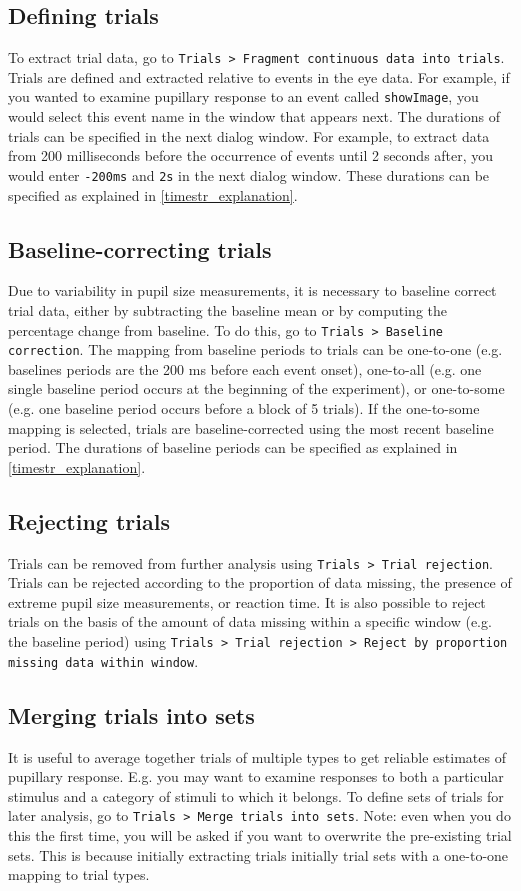 \documentclass{article}
\newcommand{\erp}{Trials }
\begin{document}
\subsection{Defining trials}
To extract trial data, go to \texttt{\erp > Fragment continuous data into trials}. Trials are defined and extracted relative to events in the eye data. For example, if you wanted to examine pupillary response to an event called \texttt{showImage}, you would select this event name in the window that appears next. The durations of trials can be specified in the next dialog window. For example, to extract data from 200 milliseconds before the occurrence of events until 2 seconds after, you would enter \texttt{-200ms} and \texttt{2s} in the next dialog window. These durations can be specified as explained in \ref{timestr_explanation}.
\subsection{Baseline-correcting trials}
Due to variability in pupil size measurements, it is necessary to baseline correct trial data, either by subtracting the baseline mean or by computing the percentage change from baseline. To do this, go to \texttt{\erp > Baseline correction}. The mapping from baseline periods to trials can be one-to-one (e.g. baselines periods are the 200 ms before each event onset), one-to-all (e.g. one single baseline period occurs at the beginning of the experiment), or one-to-some (e.g. one baseline period occurs before a block of 5 trials). If the one-to-some mapping is selected, trials are baseline-corrected using the most recent baseline period. The durations of baseline periods can be specified as explained in \ref{timestr_explanation}.
\subsection{Rejecting trials}
Trials can be removed from further analysis using \texttt{\erp > Trial rejection}. Trials can be rejected according to the proportion of data missing, the presence of extreme pupil size measurements, or reaction time. It is also possible to reject trials on the basis of the amount of data missing within a specific window (e.g. the baseline period) using \texttt{\erp > Trial rejection > Reject by proportion missing data within window}.
\subsection{Merging trials into sets} \label{trialsets}
It is useful to average together trials of multiple types to get reliable estimates of pupillary response. E.g. you may want to examine responses to both a particular stimulus and a category of stimuli to which it belongs. To define sets of trials for later analysis, go to \texttt{\erp > Merge trials into sets}. Note: even when you do this the first time, you will be asked if you want to overwrite the pre-existing trial sets. This is because initially extracting trials initially trial sets with a one-to-one mapping to trial types.
\end{document}

